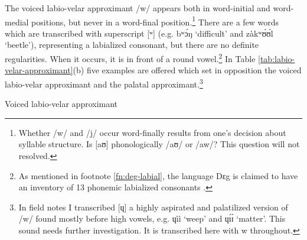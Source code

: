 The voiced labio-velar approximant /{\sls w}/ appears both in word-initial and 
word-medial positions, but never in a word-final position.\footnote{Whether 
/{\sls w}/ and /{\sls j}/ occur word-finally results from one’s decision about 
syllable structure. Is [{\sls aʊ}] phonologically /{\sls aʊ}/ or /{\sls aw}/? 
This 
question will not resolved.}  There are a few words which are transcribed with 
superscript [ʷ] (e.g. {\sls  bʷɔ́ŋ} `difficult' and {\sls  zàkʷʊ́ʊ́l} 
`beetle'),  
representing a labialized consonant, but there are  no definite regularities. 
When it  occurs, it is in front of a round vowel.\footnote{As mentioned in 
footnote \ref{fn:deg-labial}, the language Dɛg is claimed to have an inventory 
of 13 phonemic labialized consonants \citep[2]{Crou03}. } In Table 
\ref{tab:labio-velar-approximant}(b)  five examples are offered which set in 
opposition the voiced labio-velar approximant and the palatal 
approximant.\footnote{In field notes I transcribed [{\sls ɥ}]  a highly 
aspirated and palatilized version of /{\sls w}/ found mostly before high 
vowels, 
e.g. {\sls ɥìì} `weep' and {\sls ɥɪ́ɪ́}  `matter'. This sound needs  further 
investigation. It is transcribed here with {\sls w} throughout.}



\begin{table}[!htb]
\small
\centering
\caption{Voiced labio-velar approximant\label{tab:labio-velar-approximant}}

\quad
{}


\end{table}


